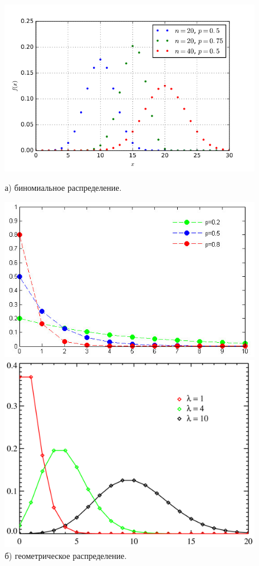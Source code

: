 \documentclass[14pt, russian]{scrartcl}
\begin{document}
\begin{figure}[H]
	\centering
	\begin{minipage}[t]{.45\textwidth}
		\centering
		\includegraphics[width=\linewidth]{./img/binom.png}
		\caption*{а) биномиальное распределение.}
	\end{minipage}
	\noindent
	\begin{minipage}[t]{.45\textwidth}
		\centering
		\includegraphics[width=\linewidth]{./img/geom.jpg}
		\caption*{б) геометрическое распределение.}
	\end{minipage}
	\begin{minipage}[t]{.45\textwidth}
		\centering
		\includegraphics[width=\linewidth]{./img/poisson.png}

\end{minipage}
\end{figure}
\end{document}
